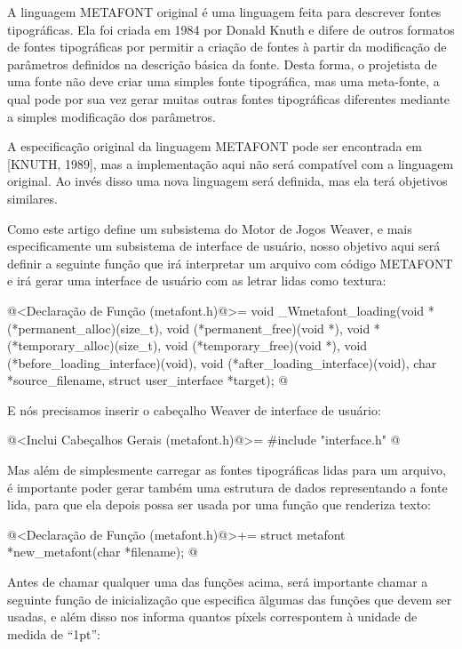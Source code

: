 
A linguagem METAFONT original é uma linguagem feita para descrever
fontes tipográficas. Ela foi criada em 1984 por Donald Knuth e difere
de outros formatos de fontes tipográficas por permitir a criação de
fontes à partir da modificação de parâmetros definidos na descrição
básica da fonte. Desta forma, o projetista de uma fonte não deve criar
uma simples fonte tipográfica, mas uma meta-fonte, a qual pode por sua
vez gerar muitas outras fontes tipográficas diferentes mediante a
simples modificação dos parâmetros.

A especificação original da linguagem METAFONT pode ser encontrada em
[KNUTH, 1989], mas a implementação aqui não será compatível com a
linguagem original. Ao invés disso uma nova linguagem será definida,
mas ela terá objetivos similares.

Como este artigo define um subsistema do Motor de Jogos Weaver, e mais
especificamente um subsistema de interface de usuário, nosso objetivo
aqui será definir a seguinte função que irá interpretar um arquivo com
código METAFONT e irá gerar uma interface de usuário com as letrar
lidas como textura:

\iniciocodigo
@<Declaração de Função (metafont.h)@>=
void _Wmetafont_loading(void *(*permanent_alloc)(size_t),
		      void (*permanent_free)(void *),
		      void *(*temporary_alloc)(size_t),
		      void (*temporary_free)(void *),
		      void (*before_loading_interface)(void),
		      void (*after_loading_interface)(void),
		      char *source_filename,
                      struct user_interface *target);
@
\fimcodigo

E nós precisamos inserir o cabeçalho Weaver de interface de usuário:

\iniciocodigo
@<Inclui Cabeçalhos Gerais (metafont.h)@>=
#include "interface.h"
@
\fimcodigo

Mas além de simplesmente carregar as fontes tipográficas lidas para um
arquivo, é importante poder gerar também uma estrutura de dados
representando a fonte lida, para que ela depois possa ser usada por
uma função que renderiza texto:

\iniciocodigo
@<Declaração de Função (metafont.h)@>+=
struct metafont *new_metafont(char *filename);
@
\fimcodigo

Antes de chamar qualquer uma das funções acima, será importante chamar
a seguinte função de inicialização que especifica ãlgumas das funções
que devem ser usadas, e além disso nos informa quantos píxels
correspontem à unidade de medida de ``1pt'':

